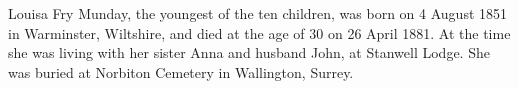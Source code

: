 Louisa Fry Munday, the youngest of the ten children, was born on 4 August 1851 in Warminster, Wiltshire, and died at the age of 30 on 26 April 1881. At the time she was living with her sister Anna and husband John, at Stanwell Lodge. She was buried at Norbiton Cemetery in	Wallington, Surrey. 

    

